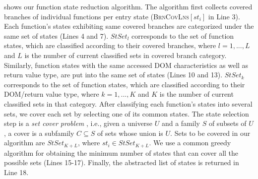  shows our function state reduction algorithm. The algorithm first collects covered branches of individual functions per entry state (\textsc{BrnCovLns}$[st_i]$ in Line 3). Each function's states exhibiting same covered branches are categorized under the same set of states (Lines 4 and 7). $StSet_{l}$ corresponds to the set of function states, which are classified according to their covered branches, where $l={1,...,L}$ and $L$ is the number of current classified sets in covered branch category. Similarly, function states with the same accessed DOM characteristics as well as return value type, are put into the same set of states (Lines 10 and 13). $StSet_{k}$ corresponds to the set of function states, which are classified according to their DOM/return value type, where $k={1,...,K}$ and $K$ is the number of current classified sets in that category.  After classifying each function's states into several sets, we cover each set by selecting one of its common states.
The state selection step is a \emph{set cover problem} \cite{Cormen:2001}, i.e., given a universe $U$ and a family $S$ of subsets of $U$, a cover is a subfamily $C \subseteq S$ of sets whose union is $U$.
Sets to be covered in our algorithm are $StSet_{K+L}$, where $st_i \in StSet_{K+L}$. We use a common greedy algorithm for obtaining the minimum number of states that can cover all the possible sets (Lines 15-17). 
Finally, the abstracted list of states is returned in Line 18.          
 
 

  
     